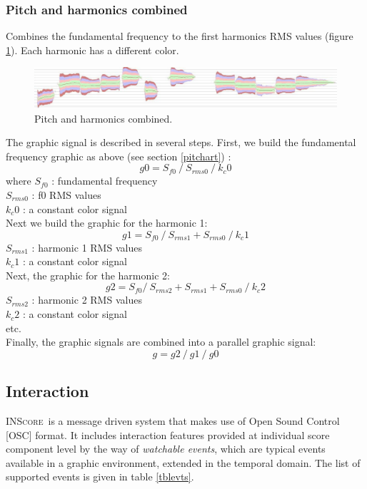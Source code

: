 \documentclass[11pt,letterpaper]{article}
\newcommand{\inscore}		{\textsc{\small INScore}}
\newcommand{\rshift}		{\hspace*{11mm}}
\begin{document}
\subsubsection{Pitch and harmonics combined}
Combines the fundamental frequency to the first harmonics RMS values
(figure \ref{fig:pitchedstackedharm}). Each harmonic has a different color.
\begin{figure}[htbp]
\centerline{
	\includegraphics[width=0.99\columnwidth]{rsrc/curves/pitchedstackedharm}}
\caption{Pitch and harmonics combined.}
\label{fig:pitchedstackedharm}
\end{figure}

The graphic signal is described in several steps. First, we build the fundamental frequency graphic as above (see section \ref{pitchart}) :
\[ g0 = S_{f0}\ /\ S_{rms0}\ /\ k_c0 \]
where $S_{f0}$ : fundamental frequency \\
\rshift	 $S_{rms0}$ : f0 RMS values \\
\rshift $k_c0$ : a constant color signal \\
\vspace*{2mm}
Next we build the graphic for the harmonic 1:
\[ g1 = S_{f0} \ /\ S_{rms1} + S_{rms0}\ /\ k_c1 \]
\rshift	 $S_{rms1}$ : harmonic 1 RMS values \\
\rshift $k_c1$ : a constant color signal \\
\vspace{2mm}
Next, the graphic for the harmonic 2:
\[ g2 = S_{f0} /\ S_{rms2} + S_{rms1}  + S_{rms0} \ /\ k_c2 \]
\rshift	 $S_{rms2}$ : harmonic 2 RMS values\\
\rshift $k_c2$ : a constant color signal \\
etc. \\
Finally, the graphic signals are combined into a parallel graphic signal:
\[ g = g2 \ /\  g1 \ /\ g0 \]


\subsection{Interaction}
\label{interact}

\inscore\ is a message driven system that makes use of Open Sound Control [OSC] format. It includes interaction features provided at individual score component level by the way of \emph{watchable events}, which are typical events available in a graphic environment, extended in the temporal domain. The list of supported events is given in table \ref{tblevts}.
\end{document}
